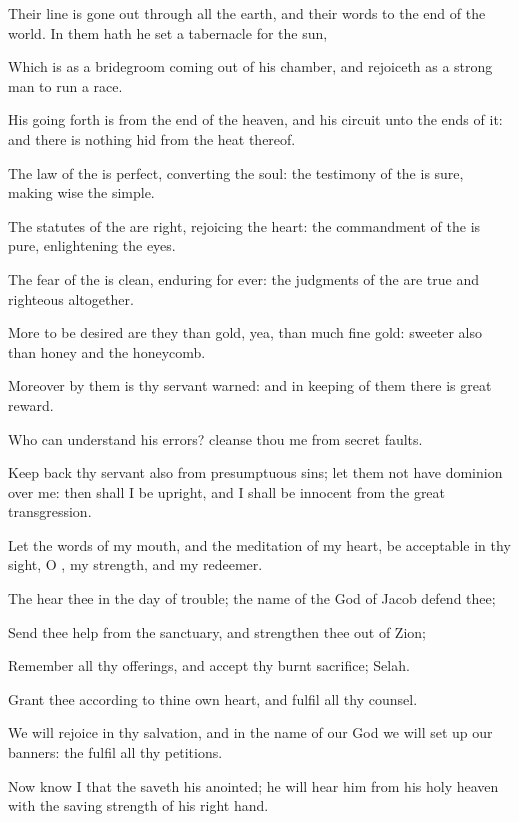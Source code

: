\Verse Their line is gone out through all the earth, and their words to the end of the world. In them hath he set a tabernacle for the sun,

\Verse Which is as a bridegroom coming out of his chamber, and rejoiceth as a strong man to run a race.

\Verse His going forth is from the end of the heaven, and his circuit unto the ends of it: and there is nothing hid from the heat thereof.

\Verse The law of the \LORD is perfect, converting the soul: the testimony of the \LORD is sure, making wise the simple.

\Verse The statutes of the \LORD are right, rejoicing the heart: the commandment of the \LORD is pure, enlightening the eyes.

\Verse The fear of the \LORD is clean, enduring for ever: the judgments of the \LORD are true and righteous altogether.

\Verse More to be desired are they than gold, yea, than much fine gold: sweeter also than honey and the honeycomb.

\Verse Moreover by them is thy servant warned: and in keeping of them there is great reward.

\Verse Who can understand his errors? cleanse thou me from secret faults.

\Verse Keep back thy servant also from presumptuous sins; let them not have dominion over me: then shall I be upright, and I shall be innocent from the great transgression.

\Verse Let the words of my mouth, and the meditation of my heart, be acceptable in thy sight, O \LORD, my strength, and my redeemer.




\Chapter
\Verse The \LORD hear thee in the day of trouble; the name of the God of Jacob defend thee;

\Verse Send thee help from the sanctuary, and strengthen thee out of Zion;

\Verse Remember all thy offerings, and accept thy burnt sacrifice; Selah.

\Verse Grant thee according to thine own heart, and fulfil all thy counsel.

\Verse We will rejoice in thy salvation, and in the name of our God we will set up our banners: the \LORD fulfil all thy petitions.

\Verse Now know I that the \LORD saveth his anointed; he will hear him from his holy heaven with the saving strength of his right hand.

